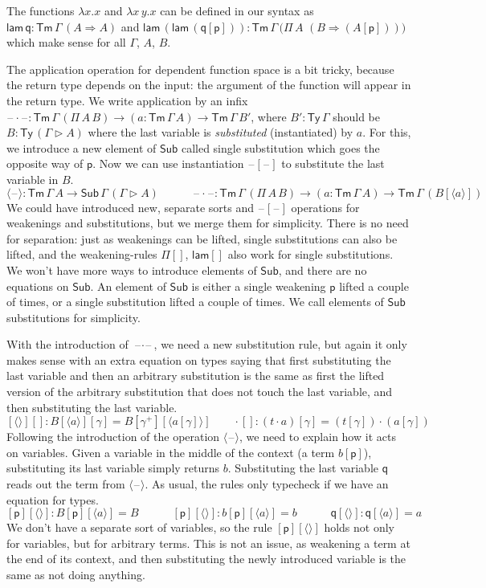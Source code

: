 \documentclass[a4paper,UKenglish]{article}
\newcommand{\ra}{\rightarrow}
\newcommand{\Ra}{\Rightarrow}
\newcommand{\Ty}{\mathsf{Ty}}
\newcommand{\Tm}{\mathsf{Tm}}
\newcommand{\Sub}{\mathsf{Sub}}
\newcommand{\p}{\mathsf{p}}
\newcommand{\q}{\mathsf{q}}
\newcommand{\ext}{\mathop{\triangleright}}
\newcommand{\lam}{\mathsf{lam}}
\newcommand{\blank}{\mathord{\hspace{1pt}\text{--}\hspace{1pt}}} %
\begin{document}
The functions $\lambda x.x$ and $\lambda x\,y.x$ can be defined in our
syntax as $\lam\,\q : \Tm\,\Gamma\,(A\Ra A)$ and
$\lam\,(\lam\,(\q[\p])) :
\Tm\,\Gamma\,\big(\Pi\,A$ $(B\Ra(A[\p]))\big)$ which make sense for all
$\Gamma$, $A$, $B$.

The application operation for dependent function space is a bit
tricky, because the return type depends on the input: the argument of
the function will appear in the return type. We write application by
an infix $\blank\cdot\blank :
\Tm\,\Gamma\,(\Pi\,A\,B)\ra(a:\Tm\,\Gamma\,A)\ra\Tm\,\Gamma\,B'$,
where $B' : \Ty\,\Gamma$ should be $B:\Ty\,(\Gamma\ext A)$ where the
last variable is \emph{substituted} (instantiated) by $a$. For this,
we introduce a new element of $\Sub$ called single substitution which
goes the opposite way of $\p$. Now we can use instantiation
$\blank[\blank]$ to substitute the last variable in $B$.
\[
\langle\blank\rangle : \Tm\,\Gamma\,A\ra\Sub\,\Gamma\,(\Gamma\ext A) \hspace{3em}
\blank\cdot\blank : \Tm\,\Gamma\,(\Pi\,A\,B)\ra(a:\Tm\,\Gamma\,A)\ra\Tm\,\Gamma\,(B[\langle a\rangle])
\]
We could have introduced new, separate sorts and $\blank[\blank]$
operations for weakenings and substitutions, but we merge them for
simplicity. There is no need for separation: just as weakenings can be
lifted, single substitutions can also be lifted, and the
weakening-rules $\Pi[]$, $\lam[]$ also work for single
substitutions. We won't have more ways to introduce elements of
$\Sub$, and there are no equations on $\Sub$. An element of $\Sub$ is
either a single weakening $\p$ lifted a couple of times, or a single
substitution lifted a couple of times. We call elements of $\Sub$
substitutions for simplicity.

With the introduction of $\blank\cdot\blank$, we need a new
substitution rule, but again it only makes sense with an extra
equation on types saying that first substituting the last variable and
then an arbitrary substitution is the same as first the lifted version
of the arbitrary substitution that does not touch the last variable,
and then substituting the last variable.
\[
[\langle\rangle][] : B[\langle a\rangle][\gamma] = B[\gamma^+][\langle a[\gamma]\rangle] \hspace{2em}
{\cdot}[] : (t\cdot a)[\gamma] = (t[\gamma])\cdot(a[\gamma])
\]
Following the introduction of the operation $\langle\blank\rangle$, we
need to explain how it acts on variables. Given a variable in the
middle of the context (a term $b[\p]$), substituting its last variable
simply returns $b$. Substituting the last variable $\q$ reads out the
term from $\langle\blank\rangle$. As usual, the rules only typecheck
if we have an equation for types.
\[
[\p][\langle\rangle] : B[\p][\langle a\rangle] = B \hspace{3em}
[\p][\langle\rangle] : b[\p ][\langle a\rangle] = b \hspace{3em}
\q[\langle\rangle] : \q[\langle a\rangle] = a
\]
We don't have a separate sort of variables, so the rule
$[\p][\langle\rangle]$ holds not only for variables, but for arbitrary
terms. This is not an issue, as weakening a term at the end of its
context, and then substituting the newly introduced variable is the
same as not doing anything.
\end{document}

